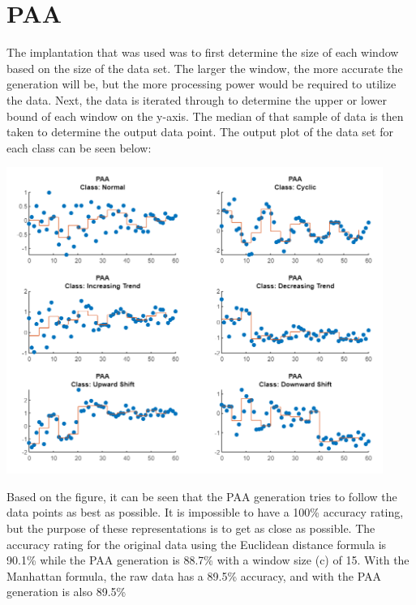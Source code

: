 \documentclass{article}
\begin{document}
\section{PAA}
The implantation that was used was to first determine the size of each window
based on the size of the data set.  The larger the window, the more accurate
the generation will be, but the more processing power would be required to 
utilize the data.  Next, the data is iterated through to determine the upper
or lower bound of each window on the y-axis.  The median of that sample of 
data is then taken to determine the output data point.
\newline
\noindent
The output plot of the data set for each class can be seen below:
\begin{center}
{\includegraphics[height=10cm]{graphics/paaplot.png}\centering}
\end{center}

Based on the figure, it can be seen that the PAA generation tries to follow
the data points as best as possible.  It is impossible to have a 100\% accuracy 
rating, but the purpose of these representations is to get as close as possible.
The accuracy rating for the original data using the Euclidean distance formula
is 90.1\% while the PAA generation is 88.7\% with a window size (c) of 15.  With the Manhattan formula, 
the raw data has a 89.5\% accuracy, and with the PAA generation is also
89.5\%
\newline
\end{document}
